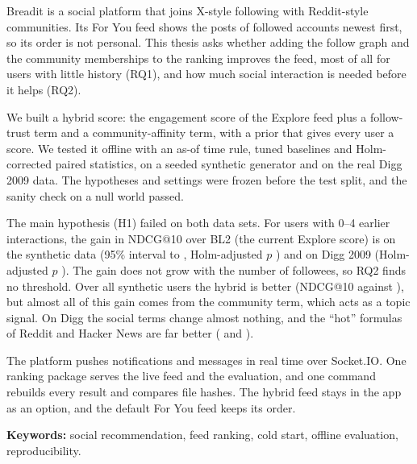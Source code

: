
Breadit is a social platform that joins X-style following with Reddit-style communities. Its For You feed shows the posts of followed accounts newest first, so its order is not personal. This thesis asks whether adding the follow graph and the community memberships to the ranking improves the feed, most of all for users with little history (RQ1), and how much social interaction is needed before it helps (RQ2).

We built a hybrid score: the engagement score of the Explore feed plus a follow-trust term and a community-affinity term, with a prior that gives every user a score. We tested it offline with an as-of time rule, tuned baselines and Holm-corrected paired statistics, on a seeded synthetic generator and on the real Digg 2009 data. The hypotheses and settings were frozen before the test split, and the sanity check on a null world passed.

The main hypothesis (H1) failed on both data sets. For users with 0--4 earlier interactions, the gain in NDCG@10 over BL2 (the current Explore score) is \eTwoWTwoMNdcgTenZeroFourGain{} on the synthetic data (95\% interval \eTwoWTwoMNdcgTenZeroFourCiLow{} to \eTwoWTwoMNdcgTenZeroFourCiHigh{}, Holm-adjusted $p$ \eTwoWTwoMNdcgTenZeroFourPHolm{}) and \eTwoDiggNdcgTenZeroFourGainFull{} on Digg 2009 (Holm-adjusted $p$ \eTwoDiggNdcgTenZeroFourPHolm{}). The gain does not grow with the number of followees, so RQ2 finds no threshold. Over all synthetic users the hybrid is better (NDCG@10 \eOneWTwoMNdcgHTenAllValue{} against \eOneWTwoMNdcgBLTwoTenAllValue{}), but almost all of this gain comes from the community term, which acts as a topic signal. On Digg the social terms change almost nothing, and the ``hot'' formulas of Reddit and Hacker News are far better (\eOneDiggNdcgBLFourTenAllValue{} and \eOneDiggNdcgBLFiveTenAllValue{}).

The platform pushes notifications and messages in real time over Socket.IO. One ranking package serves the live feed and the evaluation, and one command rebuilds every result and compares file hashes. The hybrid feed stays in the app as an option, and the default For You feed keeps its order.

\medskip
\noindent\textbf{Keywords:} social recommendation, feed ranking, cold start, offline evaluation, reproducibility.
